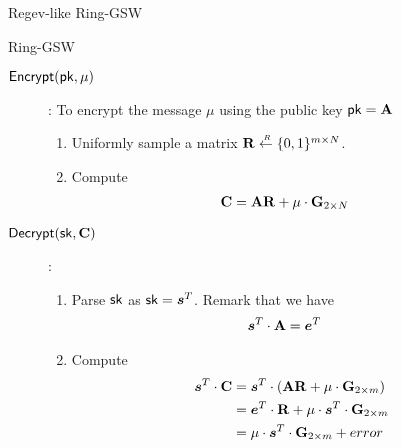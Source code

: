 \begin{subsection}{Regev-like Ring-GSW}
\begin{paragraph}{Ring-GSW}
\begin{description}
    \item[${\mathsf{Encrypt}}(\mathsf{pk}, \mu)$]: To encrypt the message $\mu$ using the public key $\mathsf{pk} = \mathbf{A}$
      \begin{enumerate}
      \item Uniformly sample a matrix $\mathbf{R} \stackrel{{\scriptscriptstyle \mkern4mu R}}{\gets} \{0,1\}^{m \times N}$.
      \item Compute
        \begin{align*}
          \mathbf{C} &= \mathbf{A} \mathbf{R} + \mu \cdot \mathbf{G}_{2\times N}
        \end{align*}
      \end{enumerate}
    \item[${\mathsf{Decrypt}}(\mathsf{sk}, \mathbf{C})$]:
      \begin{enumerate}
      \item Parse $\mathsf{sk}$ as $\sk = \vec{s}^T$. Remark that we have
        \begin{align*}
          \vec{s}^T \cdot \mat{A} &= \vec{e}^T
        \end{align*}
      \item Compute
        \begin{align*}
          \vec{s}^T \cdot \mat{C} &= \vec{s}^T \cdot (\mat{A} \mat{R} + \mu \cdot \mat{G}_{2\times m})\\
          &=\vec{e}^T \cdot \mat{R} + \mu \cdot \vec{s}^T \cdot \mat{G}_{2 \times m}\\
          &= \mu \cdot \vec{s}^T \cdot \mat{G}_{2 \times m} + error
        \end{align*}
      \end{enumerate}
    \end{description}


\end{paragraph}
\end{subsection}
